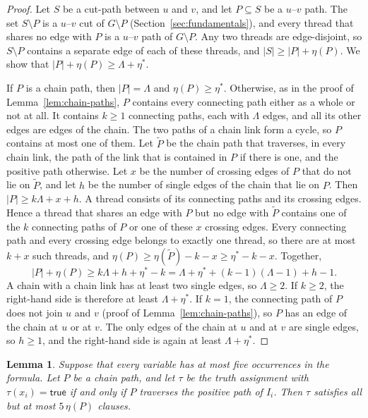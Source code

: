 \documentclass[a4paper,fleqn]{cas-sc}
\numberwithin{equation}{section}
\theoremstyle{definition}
\theoremstyle{plain}
\newtheorem{lemma}[definition]{Lemma}
\theoremstyle{remark}
\begin{document}
\begin{proof}
Let $S$ be a cut-path between $u$ and $v$, and let $P \subseteq S$ be a $u$--$v$ path.
The set $S \setminus P$ is a $u$--$v$ cut of $G \setminus P$ (Section~\ref{sec:fundamentals}), and every thread that shares no edge with $P$ is a $u$--$v$ path of $G \setminus P$.
Any two threads are edge-disjoint, so $S \setminus P$ contains a separate edge of each of these threads, and $|S| \geq |P| + \eta(P)$.
We show that $|P| + \eta(P) \geq \Lambda + \eta^{*}$.

If $P$ is a chain path, then $|P| = \Lambda$ and $\eta(P) \geq \eta^{*}$.
Otherwise, as in the proof of Lemma~\ref{lem:chain-paths}, $P$ contains every connecting path either as a whole or not at all.
It contains $k \geq 1$ connecting paths, each with $\Lambda$ edges, and all its other edges are edges of the chain.
The two paths of a chain link form a cycle, so $P$ contains at most one of them.
Let $\widetilde{P}$ be the chain path that traverses, in every chain link, the path of the link that is contained in $P$ if there is one, and the positive path otherwise.
Let $x$ be the number of crossing edges of $P$ that do not lie on $\widetilde{P}$, and let $h$ be the number of single edges of the chain that lie on $P$.
Then $|P| \geq k\Lambda + x + h$.
A thread consists of its connecting paths and its crossing edges.
Hence a thread that shares an edge with $P$ but no edge with $\widetilde{P}$ contains one of the $k$ connecting paths of $P$ or one of these $x$ crossing edges.
Every connecting path and every crossing edge belongs to exactly one thread, so there are at most $k + x$ such threads, and $\eta(P) \geq \eta(\widetilde{P}) - k - x \geq \eta^{*} - k - x$.
Together,
\[
|P| + \eta(P) \geq k\Lambda + h + \eta^{*} - k = \Lambda + \eta^{*} + (k-1)(\Lambda - 1) + h - 1.
\]
A chain with a chain link has at least two single edges, so $\Lambda \geq 2$.
If $k \geq 2$, the right-hand side is therefore at least $\Lambda + \eta^{*}$.
If $k = 1$, the connecting path of $P$ does not join $u$ and $v$ (proof of Lemma~\ref{lem:chain-paths}), so $P$ has an edge of the chain at $u$ or at $v$.
The only edges of the chain at $u$ and at $v$ are single edges, so $h \geq 1$, and the right-hand side is again at least $\Lambda + \eta^{*}$.
\end{proof}

\begin{lemma}
\label{lem:unsatisfied-clauses}
Suppose that every variable has at most five occurrences in the formula.
Let $P$ be a chain path, and let $\tau$ be the truth assignment with $\tau(x_i) = \mathsf{true}$ if and only if $P$ traverses the positive path of $I_i$.
Then $\tau$ satisfies all but at most $5\,\eta(P)$ clauses.
\end{lemma}
\end{document}
